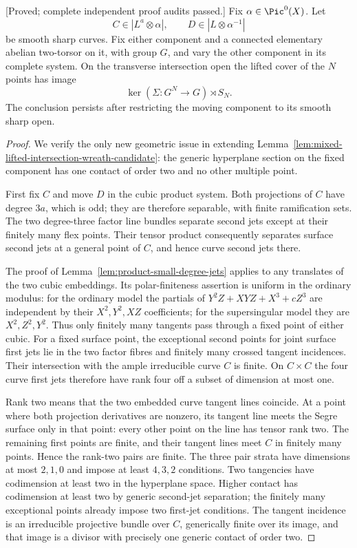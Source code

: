 \begin{lemma}
\label{lem:mixed-even-unequal-lifted-wreath-candidate}
\textup{[Proved; complete independent proof audits passed.]}
Fix $\alpha\in\Pic^0(X)$. Let
\[
 C\in|L^a\otimes\alpha|,\qquad
 D\in|L\otimes\alpha^{-1}|
\]
be smooth sharp curves. Fix either component and a connected
elementary abelian two-torsor on it, with group $G$, and vary
the other component in its complete system. On the transverse
intersection open the lifted cover of the $N$ points has image
\[
                     \ker(\Sigma:G^N\to G)\rtimes S_N.
\]
The conclusion persists after restricting the moving component
to its smooth sharp open.
\end{lemma}
\begin{proof}
We verify the only new geometric issue in extending
Lemma~\ref{lem:mixed-lifted-intersection-wreath-candidate}:
the generic hyperplane section on the fixed component has
one contact of order two and no other multiple point.

First fix $C$ and move $D$ in the cubic product system.
Both projections of $C$ have degree $3a$, which is odd;
they are therefore separable, with finite ramification sets.
The two degree-three factor line bundles separate second
jets except at their finitely many flex points. Their tensor
product consequently separates surface second jets at a
general point of $C$, and hence curve second jets there.

The proof of Lemma~\ref{lem:product-small-degree-jets} applies
to any translates of the two cubic embeddings. Its
polar-finiteness assertion is uniform in the ordinary modulus:
for the ordinary model the partials of
$Y^2Z+XYZ+X^3+cZ^3$ are independent by their $X^2,Y^2,XZ$
coefficients; for the supersingular model they are
$X^2,Z^2,Y^2$. Thus only finitely many tangents pass through
a fixed point of either cubic. For a fixed surface point,
the exceptional second points for joint surface first jets
lie in the two factor fibres and finitely many crossed
tangent incidences. Their intersection with the ample
irreducible curve $C$ is finite. On $C\times C$ the four
curve first jets therefore have rank four off a subset of
dimension at most one.

Rank two means that the two embedded curve tangent lines
coincide. At a point where both projection derivatives are
nonzero, its tangent line meets the Segre surface only in
that point: every other point on the line has tensor rank
two. The remaining first points are finite, and their
tangent lines meet $C$ in finitely many points. Hence the
rank-two pairs are finite. The three pair strata have
dimensions at most $2,1,0$ and impose at least $4,3,2$
conditions. Two tangencies have codimension at least two
in the hyperplane space. Higher contact has codimension
at least two by generic second-jet separation; the finitely
many exceptional points already impose two first-jet
conditions. The tangent incidence is an irreducible
projective bundle over $C$, generically finite over its
image, and that image is a divisor with precisely one
generic contact of order two.


\end{proof}
